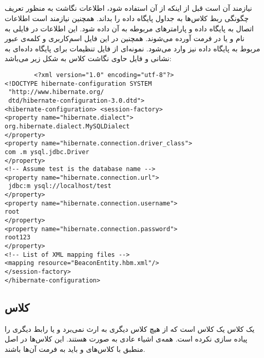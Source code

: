 \documentclass[oneside]{report}
\begin{document}
	\subsection{ {\normalsize {}} }
	{\normalsize {}}
	نیازمند آن است  قبل از اینکه از آن استفاده شود، اطلاعات نگاشت به منظور تعریف چگونگی ربط کلاس‌ها به جداول پایگاه داده را بداند. همچنین 
	{\normalsize {}}
	نیازمند است اطلاعات اتصال به پایگاه داده و پارامترهای مربوطه به آن داده شود. این اطلاعات در فایلی به نام
	{\normalsize {}}
	و یا
	{\normalsize {}}
	در فرمت 
	{\normalsize {}}
	آورده می‌شوند.  همچنین در این فایل اسم‌کاربری و کلمه‌ی عبور مربوط به پایگاه داده نیز وارد می‌شود.
	\noindent
	نمونه‌ای از فایل تنظیمات برای پایگاه داده‌ای به نشانی 
		{\normalsize {}}
و	فایل حاوی نگاشت کلاس 
			{\normalsize {}}
	به شکل زیر می‌باشد:‌
	\begin{latin}
		\begin{verbatim}
		<?xml version="1.0" encoding="utf-8"?>
<!DOCTYPE hibernate-configuration SYSTEM
 "http://www.hibernate.org/
 dtd/hibernate-configuration-3.0.dtd">
<hibernate-configuration> <session-factory>
<property name="hibernate.dialect">
org.hibernate.dialect.MySQLDialect
</property>
<property name="hibernate.connection.driver_class">
com .m ysql.jdbc.Driver
</property>
<!-- Assume test is the database name -->
<property name="hibernate.connection.url">
 jdbc:m ysql://localhost/test
</property>
<property name="hibernate.connection.username">
root
</property>
<property name="hibernate.connection.password">
root123
</property>
<!-- List of XML mapping files -->
<mapping resource="BeaconEntity.hbm.xml"/>
</session-factory> 
</hibernate-configuration>
		\end{verbatim}
		
	\end{latin}	

	\subsection{ کلاس{\normalsize {}} }
	یک کلاس 
				{\normalsize {}}
		یک کلاس 
						{\normalsize {}}
	است که از هیچ کلاس دیگری به ارث نمی‌برد و یا رابط 
	دیگری را پیاده سازی نکرده است.	همه‌ی اشیاء عادی 			
							{\normalsize {}}	
	به صورت 
							{\normalsize {}}
							هستند. این کلاس‌ها در اصل منطبق با کلاس‌های 
													{\normalsize {}}
				و باید به فرمت آن‌ها باشند. 
				
\end{document}

